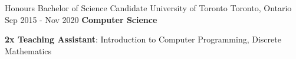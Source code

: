 
\begin{cventries}
  \cventry
    {Honours Bachelor of Science Candidate}
    {University of Toronto}
    {Toronto, Ontario}
    {Sep 2015 - Nov 2020}
    {\textbf{Computer Science}}
    {
      \begin{cvitems}
        \item {\textbf{2x Teaching Assistant}: Introduction to Computer Programming, Discrete Mathematics}
      \end{cvitems}
    }
\end{cventries}
